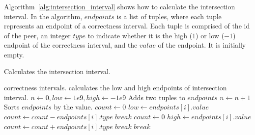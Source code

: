Algorithm~\ref{alg:intersection_interval} shows how to calculate the
intersection interval.  In the algorithm, $endpoints$ is a list of tuples,
where each tuple represents an endpoint of a correctness interval. Each tuple
is comprised of the id of the peer, an integer $type$ to indicate whether it is
the high ($1$) or low ($-1$) endpoint of the correctness interval, and the
$value$ of the endpoint. It is initially empty.

\begin{algorithm}[!t]
    \centering
    \small
    \caption{Calculates the intersection interval.}
    \begin{algorithmic}[1]
        \REQUIRE
            correctness intervals.
        \ENSURE
            calculates the low and high endpoints of intersection interval.
        \STATE
        \STATE
            $n \leftarrow 0, low \leftarrow 1e9, high \leftarrow -1e9$
            \STATE
            Adds two tuples to $endpoints$
            \STATE
            $n \leftarrow n + 1$
        \ENDFOR
        \STATE
            Sorts $endpoints$ by the value.
        \STATE
        \STATE
            \STATE
            \STATE
            $count \leftarrow 0$
                \STATE
                $low \leftarrow endpoints[i].value$
                \STATE
                $count \leftarrow count - endpoints[i].type$
                \STATE
                    $break$
                \ENDIF
            \ENDFOR
            \STATE
            \STATE
            \STATE
            $count \leftarrow 0$
                \STATE
                $high \leftarrow endpoints[i].value$
                \STATE
                $count \leftarrow count + endpoints[i].type$
                    \STATE
                    $break$
                \ENDIF
            \ENDFOR
            \STATE
            \STATE
                \STATE
                $break$
            \ENDIF
        \ENDFOR
    \end{algorithmic}
\label{alg:intersection_interval}
\end{algorithm}

